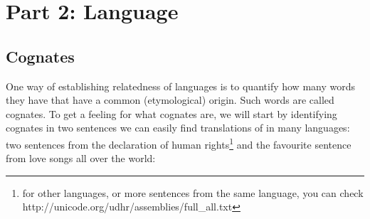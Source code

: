 \documentclass[a4paper, 9pt]{article}
\begin{document}
\section{Part 2: Language}\label{part-2-language}

\subsection{Cognates}\label{cognates}

One way of establishing relatedness of languages is to quantify how many
words they have that have a common (etymological) origin. Such words are
called cognates. To get a feeling for what cognates are, we will start
by identifying cognates in two sentences we can easily find translations
of in many languages: two sentences from the declaration of human
rights\footnote{for other languages, or more sentences from the same language, you can check http://unicode.org/udhr/assemblies/full\_all.txt}
and the favourite sentence from love songs all over the world:
\end{document}
